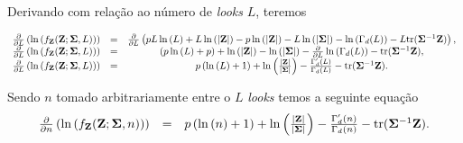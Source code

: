 \documentclass[10pt,a4paper]{article}
\begin{document}
Derivando com relação ao número de {\it looks} $L$, teremos

\begin{equation}\label{sec71eqn3}
\begin{array}{ccc}
	\frac{\partial}{\partial L}\left(\ln{\left(f_{{\bf Z}}({\bf Z};{\bf \Sigma},L)\right)}\right)&=&\frac{\partial}{\partial L}\left(pL\ln{\left(L\right)}+L\ln{\left( |{\bf Z}|\right)}-p\ln{\left( |{\bf Z}|\right)} - L \ln{\left(|{\bf \Sigma}|\right)}-\ln{\left(\Gamma_d(L)\right)}-L\mathrm{tr}{({\bf \Sigma}^{-1}{\bf Z})}\right), \\
	\frac{\partial}{\partial L}\left(\ln{\left(f_{{\bf Z}}({\bf Z};{\bf \Sigma},L)\right)}\right)&=&\left(p\ln{\left(L\right)}+p\right)+\ln{\left( |{\bf Z}|\right)} - \ln{\left(|{\bf \Sigma}|\right)}-\frac{\partial}{\partial L}\ln{\left(\Gamma_d(L)\right)}-\mathrm{tr}{({\bf \Sigma}^{-1}{\bf Z})}, \\
	\frac{\partial}{\partial L}\left(\ln{\left(f_{{\bf Z}}({\bf Z};{\bf \Sigma},L)\right)}\right)&=&p\left(\ln{\left(L\right)}+1\right)+\ln{\left(\frac{|{\bf Z}|}{|\bf \Sigma|}\right)}-\frac{\Gamma^{\prime}_d(L)}{\Gamma_d(L)}-\mathrm{tr}{({\bf \Sigma}^{-1}{\bf Z})}. \\
\end{array}
\end{equation}

Sendo $n$ tomado arbitrariamente entre o $L$ {\it looks} temos a seguinte equação
\begin{equation}\label{sec71eqn4}
\begin{array}{ccc}
	\frac{\partial}{\partial n}\left(\ln{\left(f_{{\bf Z}}({\bf Z};{\bf \Sigma},n)\right)}\right)&=&p\left(\ln{\left(n\right)}+1\right)+\ln{\left(\frac{|{\bf Z}|}{|\bf \Sigma|}\right)}-\frac{\Gamma^{\prime}_d(n)}{\Gamma_d(n)}-\mathrm{tr}{({\bf \Sigma}^{-1}{\bf Z})}. \\
\end{array}
\end{equation}


 
\end{document}
